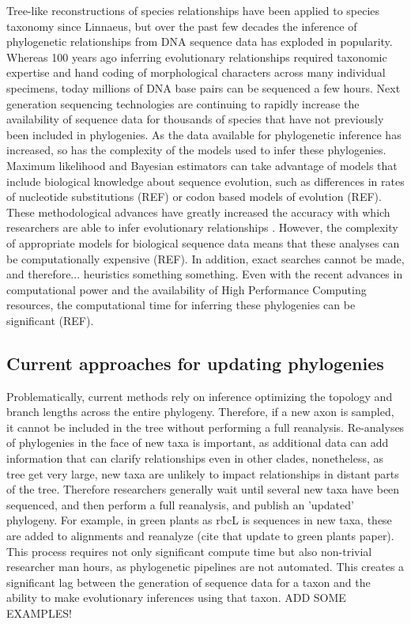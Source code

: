 \documentclass[10pt]{article}
\begin{document}
Tree-like reconstructions of species relationships have been applied to species taxonomy since Linnaeus, but over the past few decades the inference of phylogenetic relationships from DNA sequence data has exploded in popularity. Whereas 100 years ago inferring evolutionary relationships required taxonomic expertise and hand coding of morphological characters across many individual specimens, today millions of DNA base pairs can be sequenced a few hours. Next generation sequencing technologies are continuing to rapidly increase the availability of sequence data for thousands of species that have not previously been included in phylogenies. As the data available for phylogenetic inference has increased, so has the complexity of the models used to infer these phylogenies. Maximum likelihood and Bayesian estimators can take advantage of models that include biological knowledge about sequence evolution, such as differences in rates of nucleotide substitutions (REF) or codon based models of evolution (REF). These methodological advances have greatly increased the accuracy with which researchers are able to infer evolutionary relationships \cite{kuhner_simulation_1994}. However, the complexity of appropriate models for biological sequence data means that these analyses can be computationally expensive (REF). In addition, exact searches cannot be made, and therefore... heuristics something something. Even with the recent advances in computational power and the availability of High Performance Computing resources, the computational time for inferring these phylogenies can be significant (REF). 


\subsection*{Current approaches for updating phylogenies}

Problematically, current methods rely on inference optimizing the topology and branch lengths across the entire phylogeny. Therefore, if a new axon is sampled, it cannot be included in the tree without performing a full reanalysis.  Re-analyses of phylogenies in the face of new taxa is important, as additional data can add information that can clarify relationships even in other clades, nonetheless, as tree get very large, new taxa are unlikely to impact relationships in distant parts of the tree. Therefore researchers generally wait until several new taxa have been sequenced, and then perform a full reanalysis, and publish an 'updated' phylogeny. For example, in green plants as rbcL is sequences in new taxa, these are added to alignments and reanalyze (cite that update to green plants paper). This process requires not only significant compute time but also non-trivial researcher man hours, as phylogenetic pipelines are not automated. This creates a significant lag between the generation of sequence data for a taxon and the ability to make evolutionary inferences using that taxon.
ADD SOME EXAMPLES!
\end{document}
